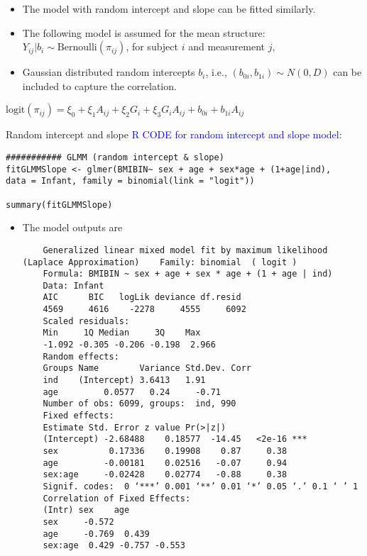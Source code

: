 \documentclass{beamer}
\begin{document}
\begin{frame}
\begin{itemize}\itemsep=0.2cm
	\item The model with random intercept and slope can be fitted similarly.
	\item The following model is assumed for the mean structure: $Y_{ij} | b_i  \sim  \mbox{Bernoulli}(\pi_{ij})$, for subject $i$ and measurement $j$,
	\item Gaussian distributed random intercepts $b_i$, i.e., $(b_{0i},b_{1i})  \sim N(0,D)$ can be included to capture the correlation.
\end{itemize}
$
\mbox{logit}(\pi_{ij})  =  \xi_0  +  \xi_1 A_{ij} + \xi_2 G_i + \xi_3 G_i A_{ij} +   b_{0i} + b_{1i}A_{ij}$
\end{frame}

\begin{frame}[fragile]{Random intercept and slope}
\textcolor{blue}{R CODE for random intercept and slope model:}
\scriptsize
\begin{verbatim}
########### GLMM (random intercept & slope)
fitGLMMSlope <- glmer(BMIBIN~ sex + age + sex*age + (1+age|ind), 
data = Infant, family = binomial(link = "logit"))

summary(fitGLMMSlope)
\end{verbatim}
\end{frame}

\begin{frame}[fragile]
\scriptsize
\begin{itemize}
	\item The model outputs are
	\begin{verbatim}
	Generalized linear mixed model fit by maximum likelihood (Laplace Approximation) 	Family: binomial  ( logit )
	Formula: BMIBIN ~ sex + age + sex * age + (1 + age | ind)
	Data: Infant
	AIC      BIC   logLik deviance df.resid 
	4569     4616    -2278     4555     6092 
	Scaled residuals: 
	Min     1Q Median     3Q    Max 
	-1.092 -0.305 -0.206 -0.198  2.966 
	Random effects:
	Groups Name        Variance Std.Dev. Corr 
	ind    (Intercept) 3.6413   1.91          
	age         0.0577   0.24     -0.71
	Number of obs: 6099, groups:  ind, 990
	Fixed effects:
	Estimate Std. Error z value Pr(>|z|)    
	(Intercept) -2.68488    0.18577  -14.45   <2e-16 ***
	sex          0.17336    0.19908    0.87     0.38    
	age         -0.00181    0.02516   -0.07     0.94    
	sex:age     -0.02428    0.02774   -0.88     0.38    
	Signif. codes:  0 ‘***’ 0.001 ‘**’ 0.01 ‘*’ 0.05 ‘.’ 0.1 ‘ ’ 1
	Correlation of Fixed Effects:
	(Intr) sex    age   
	sex     -0.572              
	age     -0.769  0.439       
	sex:age  0.429 -0.757 -0.553
	\end{verbatim}
\end{itemize}
\end{frame}
\end{document}
